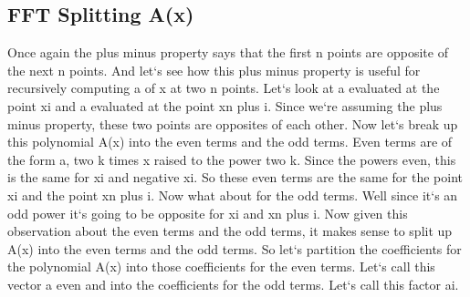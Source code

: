 \subsection{FFT  Splitting A(x)}
Once again the plus minus property says that the first n points are opposite of the next n points.
And let`s see how this plus minus property is useful for recursively computing a of x at two n points.
Let`s look at a evaluated at the point xi and a evaluated at the point xn plus i.
Since we`re assuming the plus minus property, these two points are opposites of each other.
Now let`s break up this polynomial A(x) into the even terms and the odd terms.
Even terms are of the form a, two k times x raised to the power two k.
Since the powers even, this is the same for xi and negative xi.
So these even terms are the same for the point xi and the point xn plus i.
Now what about for the odd terms.
Well since it`s an odd power it`s going to be opposite for xi and xn plus i.
Now given this observation about the even terms and the odd terms, it makes sense to split up A(x) into the even terms and the odd terms.
So let`s partition the coefficients for the polynomial A(x) into those coefficients for the even terms.
Let`s call this vector a even and into the coefficients for the odd terms.
Let`s call this factor ai.


